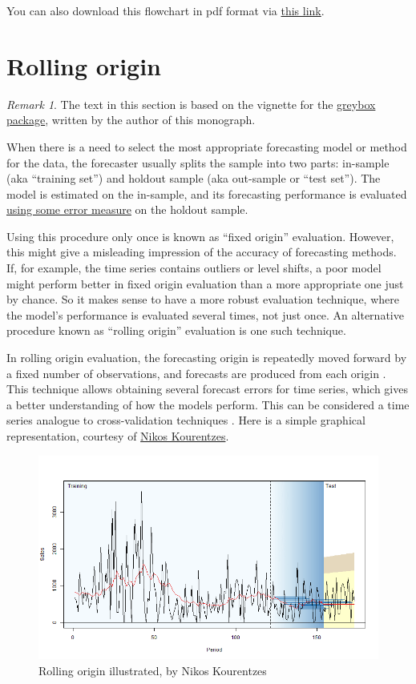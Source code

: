 \documentclass[
]{book}
\theoremstyle{definition}
\theoremstyle{definition}
\theoremstyle{definition}
\theoremstyle{definition}
\theoremstyle{remark}
\newtheorem*{remark}{Remark}
\begin{document}
You can also download this flowchart in pdf format via \href{./images/errorMeasuresFlowChart-v2.pdf}{this link}.

\hypertarget{rollingOrigin}{%
\section{Rolling origin}\label{rollingOrigin}}

\begin{remark}
The text in this section is based on the vignette for the \href{https://cran.r-project.org/package=greybox}{greybox package}, written by the author of this monograph.
\end{remark}

When there is a need to select the most appropriate forecasting model or method for the data, the forecaster usually splits the sample into two parts: in-sample (aka ``training set'') and holdout sample (aka out-sample or ``test set''). The model is estimated on the in-sample, and its forecasting performance is evaluated \protect\hyperlink{errorMeasures}{using some error measure} on the holdout sample.

Using this procedure only once is known as ``fixed origin'' evaluation. However, this might give a misleading impression of the accuracy of forecasting methods. If, for example, the time series contains outliers or level shifts, a poor model might perform better in fixed origin evaluation than a more appropriate one just by chance. So it makes sense to have a more robust evaluation technique, where the model's performance is evaluated several times, not just once. An alternative procedure known as ``rolling origin'' evaluation is one such technique.

In rolling origin evaluation, the forecasting origin is repeatedly moved forward by a fixed number of observations, and forecasts are produced from each origin \citep{Tashman2000}. This technique allows obtaining several forecast errors for time series, which gives a better understanding of how the models perform. This can be considered a time series analogue to cross-validation techniques \citep{WikipediaCrossValidation2020}. Here is a simple graphical representation, courtesy of \href{https://kourentzes.com/forecasting/}{Nikos Kourentzes}.

\begin{figure}
\includegraphics[width=0.75\linewidth]{./images/03-ROAnimation} \caption{Rolling origin illustrated, by Nikos Kourentzes}\label{fig:ROProcessAnimation}
\end{figure}
\end{document}
